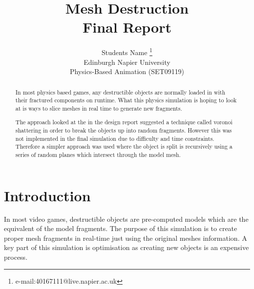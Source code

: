 \documentclass[conference,backref=page]{acmsiggraph}
\title{Mesh Destruction\\
	   Final Report}
\author{Students Name \thanks{e-mail:40167111@live.napier.ac.uk} \\
Edinburgh Napier University\\
Physics-Based Animation (SET09119)}
\begin{document}

\maketitle

\raggedbottom

\begin{abstract}
In most physics based games, any destructible objects are normally loaded in with their fractured components on runtime. What this
physics simulation is hoping to look at is ways to slice meshes in real time to generate new fragments.

The approach looked at the in the design report suggested a technique called voronoi shattering in order to break the objects up into random fragments. However this was not implemented in the final simulation due to difficulty and time constraints. Therefore a simpler approach was used where the object is split is recursively using a series of random planes which intersect through the model mesh.

\end{abstract}



\keywordlist


\section{Introduction}

In most video games, destructible objects are pre-computed models which are the equivalent of the model fragments. The purpose of this simulation is to create proper mesh fragments in real-time just using the original meshes information. A key part of this simulation is optimisation as creating new objects is an expensive process.  
\end{document}
